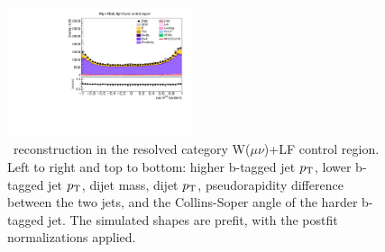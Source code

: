 \begin{figure}[tbp]
\begin{center}
    \includegraphics[width=0.48\textwidth]{figures/wlnhbb2016/resolved/WmnWHLightFlavorCR_hbbCosThetaCSJ1.pdf}
    \caption{\HBB\ reconstruction in the resolved category W($\mu\nu$)+LF control region.
    Left to right and top to bottom: higher b-tagged jet $p_{\mathrm{T}}$, lower b-tagged jet $p_{\mathrm{T}}$, dijet mass, dijet $p_{\mathrm{T}}$, 
    pseudorapidity difference between the two jets, and the Collins-Soper angle of the harder b-tagged jet.
    The simulated shapes are prefit, with the postfit normalizations applied.}
    \label{fig:res_WmnLF_Hbb}
  \end{center}
\end{figure}
\clearpage

